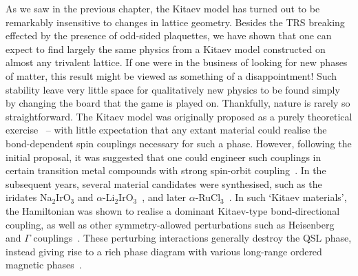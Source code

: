 
As we saw in the previous chapter, the Kitaev model has turned out to be remarkably insensitive to changes in lattice geometry. Besides the TRS breaking effected by the presence of odd-sided plaquettes, we have shown that one can expect to find largely the same physics from a Kitaev model constructed on almost any trivalent lattice. If one were in the business of looking for new phases of matter, this result might be viewed as something of a disappointment! Such stability leave very little space for qualitatively new physics to be found simply by changing the board that the game is played on. 
Thankfully, nature is rarely so straightforward. The Kitaev model was originally proposed as a purely theoretical exercise~\cite{kitaev_anyons_2006} -- with little expectation that any extant material could realise the bond-dependent spin couplings necessary for such a phase. However, following the initial proposal, it was suggested that one could engineer such couplings in certain transition metal compounds with strong spin-orbit coupling~\cite{trebst_kitaev_2022,jackeli_mott_2009, chaloupka_kitaev-heisenberg_2010}. In the subsequent years, several material candidates were synthesised, such as the iridates Na$_2$IrO$_3$ and $\alpha$-Li$_2$IrO$_3$~\cite{singh_antiferromagnetic_2010, singh_relevance_2012,revelli_fingerprints_2020}, and later $\alpha$-RuCl$_3$~\cite{sandilands_scattering_2015,banerjee_proximate_2016}. In such `Kitaev materials', the Hamiltonian was shown to realise a dominant Kitaev-type bond-directional coupling, as well as other symmetry-allowed perturbations such as Heisenberg and $\Gamma$ couplings~\cite{rau_generic_2014}. These perturbing interactions generally destroy the QSL phase, instead giving rise to a rich phase diagram with various long-range ordered magnetic phases~\cite{chaloupka_zigzag_2013,rau_spin-orbit_2016}. 

